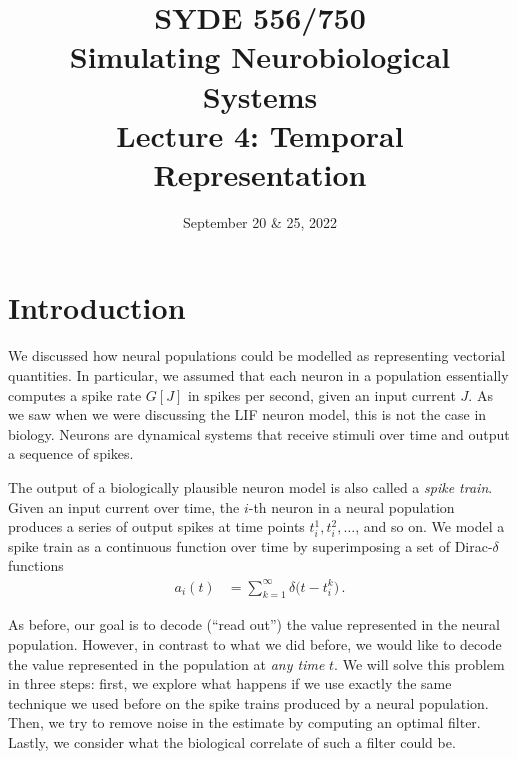 \documentclass[10pt,letterpaper,oneside]{article}
\date{September 20 \& 25, 2022}
\title{SYDE 556/750 \\ Simulating Neurobiological Systems \\ Lecture 4: Temporal Representation}
\begin{document}

\section{Introduction}


We discussed how neural populations could be modelled as representing vectorial quantities. In particular, we assumed that each neuron in a population essentially computes a spike rate $G[J]$ in spikes per second, given an input current $J$. As we saw when we were discussing the LIF neuron model, this is not the case in biology. Neurons are dynamical systems that receive stimuli over time and output a sequence of spikes.

The output of a biologically plausible neuron model is also called a \emph{spike train}. Given an input current over time, the $i$-th neuron in a neural population produces a series of output spikes at time points $t^1_i, t^2_i, \ldots$, and so on. We model a spike train as a continuous function over time by superimposing a set of Dirac-$\delta$ functions
\begin{align*}
	a_i(t) &= \sum_{k = 1}^\infty \delta\big(t - t^k_i\big) \,.
\end{align*}


As before, our goal is to decode (\enquote{read out}) the value represented in the neural population. However, in contrast to what we did before, we would like to decode the value represented in the population at \emph{any time} $t$. We will solve this problem in three steps: first, we explore what happens if we use exactly the same technique we used before on the spike trains produced by a neural population. Then, we try to remove noise in the estimate by computing an optimal filter. Lastly, we consider what the biological correlate of such a filter could be.
\end{document}
